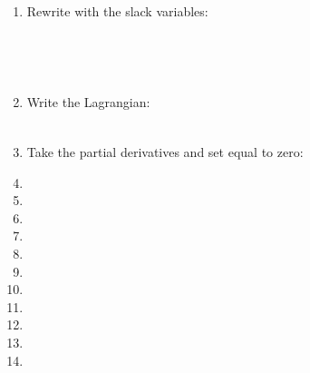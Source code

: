 \documentclass[]{book}
\theoremstyle{definition}
\theoremstyle{definition}
\theoremstyle{definition}
\theoremstyle{remark}
\begin{document}
\begin{enumerate}
\item Rewrite with the slack variables:
$$\phantom{max_{x_1,x_2} f(x) = -(x_1^2 + 2x_2^2) \text{ s.t. } 
\begin{array}{l}
x_1 + x_2 \le 4 - s_1^2\\
-x_1 \le 0 - s_2^2\\
-x_2 \le 0 - s_3^2
\end{array}}$$

\item Write the Lagrangian:
$$\phantom{L(x_1, x_2, \lambda_1, \lambda_2, \lambda_3, s_1, s_2, s_3) =  -(x_1^2 + 2x_2^2) - \lambda_1(x_1 + x_2 + s_1^2  - 4) - \lambda_2(-x_1 + s_2^2) - \lambda_3(-x_2 + s_3^2)}$$
\item Take the partial derivatives and set equal to zero:
 
\item[]
\item[]
\item[]
\item[]
\item[]
\item[]
\item[]
\item[]
\item[]
\item[]
\item[]


\end{enumerate}
\end{document}
